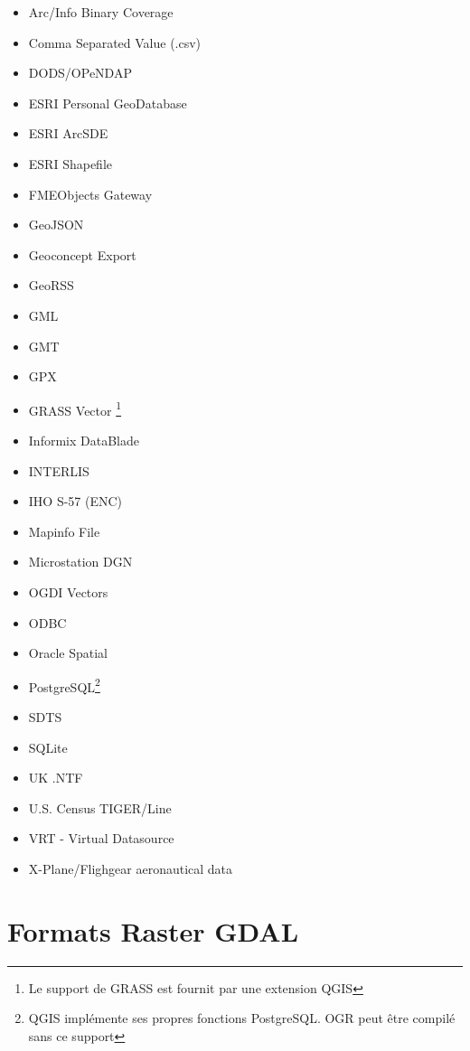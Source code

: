 \begin{itemize}[label=--]
\item Arc/Info Binary Coverage
\item Comma Separated Value (.csv) 
\item DODS/OPeNDAP
\item ESRI Personal GeoDatabase
\item ESRI ArcSDE
\item ESRI Shapefile
\item FMEObjects Gateway
\item GeoJSON
\item Geoconcept Export
\item GeoRSS
\item GML
\item GMT
\item GPX
\item GRASS Vector \footnote{Le support de GRASS est fournit par une extension QGIS}
\item Informix DataBlade
\item INTERLIS
\item IHO S-57 (ENC)
\item Mapinfo File
\item Microstation DGN
\item OGDI Vectors
\item ODBC
\item Oracle Spatial
\item PostgreSQL\footnote{QGIS implémente ses propres fonctions PostgreSQL. OGR peut être compilé sans ce support}
\item SDTS
\item SQLite
\item UK .NTF
\item U.S. Census TIGER/Line
\item VRT - Virtual Datasource
\item X-Plane/Flighgear aeronautical data
\end{itemize}

\section{Formats Raster GDAL}\label{appdx_gdal}


